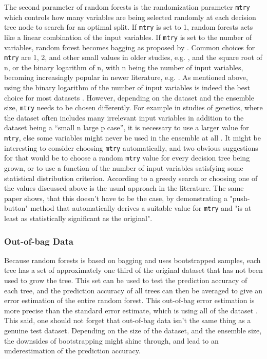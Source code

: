 \documentclass[a4paper,man,12pt,apacite]{apa6} %
\begin{document}
The second parameter of random forests is the randomization parameter
\texttt{mtry} which controls how many variables are being selected randomly
at each decision tree node to search for an optimal split.
If \texttt{mtry} is set to 1, random forests acts like a linear combination
of the input variables.
If \texttt{mtry} is set to the number of variables, random forest becomes
bagging as proposed by \cite{breiman1996bagging}.
Common choices for \texttt{mtry} are 1, 2, and other small values in
older studies, e.g. \cite{breiman2001random}, and the square root of n,
or the binary logarithm of n, with n being the number of input variables,
becoming increasingly popular in newer literature, e.g.
\cite{strobl2009introduction}.
As mentioned above, using the binary logarithm of the number of
input variables is indeed the best choice for most datasets
\cite{banfield2007comparison}.
However, depending on the dataset and the ensemble size, \texttt{mtry}
needs to be chosen differently.
For example in studies of genetics, where the dataset often includes many
irrelevant input variables in addition to the dataset being a
“small n large p case”, it is necessary to use a larger value
for \texttt{mtry}, else some variables might never be used in the ensemble
at all \cite{strobl2009introduction}.
It might be interesting to consider choosing \texttt{mtry} automatically,
and two obvious suggestions for that would be to choose a random \texttt{mtry}
value for every decision tree being grown, or to use a function of the
number of input variables satisfying some statistical distribution criterion.
According to \cite{bernard2008forest} a greedy search or choosing one of
the values discussed above is the usual approach in the literature.
The same paper shows, that this doesn't have to be the case, by demonstrating
a "push-button" method that automatically derives a suitable value for
\texttt{mtry} and "is at least as statistically significant as the original".

\subsubsection{Out-of-bag Data}
Because random forests is based on bagging and uses bootstrapped samples,
each tree has a set of approximately one third of the original dataset
that has not been used to grow the tree.
This set can be used to test the prediction accuracy of each tree,
and the prediction accuracy of all trees can then be averaged to give an
error estimation of the entire random forest.
This out-of-bag error estimation is more precise than the standard error
estimate, which is using all of the dataset \cite{strobl2009introduction}.
This said, one should not forget that out-of-bag data isn't the
same thing as a genuine test dataset.
Depending on the size of the dataset, and the ensemble size, the downsides
of bootstrapping might shine through, and lead to an underestimation of
the prediction accuracy.
\end{document}
